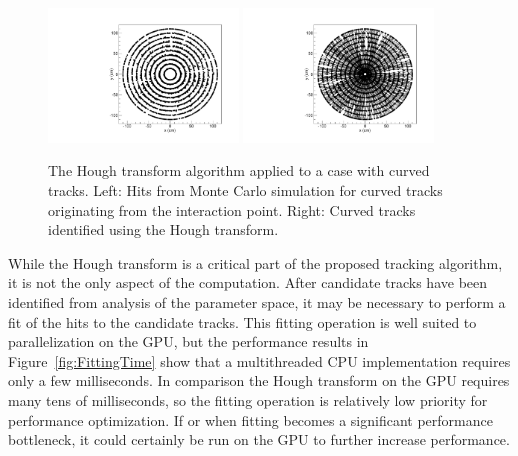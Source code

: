 \documentclass{JINST}
\begin{document}
\begin{figure}[!Hhtb]
\begin{center}
	\includegraphics[width=0.45\textwidth]{figs/curved_500events_hits.pdf}
	\includegraphics[width=0.45\textwidth]{figs/curved_500events_hits_tracks.pdf}
	\caption{The Hough transform algorithm applied to a case with curved tracks. Left: Hits from Monte Carlo
	simulation for curved tracks originating from the interaction point. Right: Curved tracks identified using the
	Hough transform. \label{fig:hough_curved}}
\end{center}
\end{figure}

While the Hough transform is a critical part of the proposed tracking algorithm, it is not the only aspect of the computation.  After candidate tracks have been 
identified from analysis of the parameter space, it may be necessary to perform a fit of the hits to the candidate tracks.  This fitting operation is well suited
 to parallelization on the GPU, but the performance results in Figure~\ref{fig:FittingTime} show that a multithreaded CPU implementation
 requires only a few milliseconds.  In comparison the Hough transform on the GPU requires many tens of milliseconds, so the fitting operation is relatively low priority for performance optimization.  If or when fitting becomes a significant performance bottleneck, it could certainly be run on the GPU to further increase performance.
\end{document}
